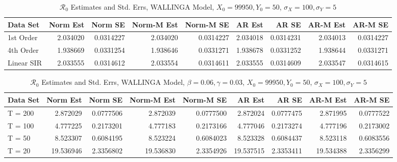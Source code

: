 \message{ !name(draft_v13.tex)}\documentclass[12pt]{article}
\newcommand{\rr}{\ensuremath{\mathcal{R}_0}}
\begin{document}
\begin{table}[H]
	
	\caption{\label{tab:}$\rr$ Estimates and Std. Errs, WALLINGA Model,
		$X_0 = 99950, Y_0 = 50$, $\sigma_X = 100, \sigma_Y = 5$}
	\centering
	\begin{tabular}[t]{l|r|r|r|r|r|r|r|r}
		\hline
		Data Set & Norm Est & Norm SE & Norm-M Est & Norm-M SE & AR Est & AR SE & AR-M Est & AR-M SE\\
		\hline
		1st Order & 2.034020 & 0.0314227 & 2.034020 & 0.0314227 & 2.034018 & 0.0314231 & 2.034013 & 0.0314227\\
		\hline
		4th Order & 1.938669 & 0.0331254 & 1.938646 & 0.0331271 & 1.938678 & 0.0331252 & 1.938644 & 0.0331271\\
		\hline
		Linear SIR & 2.033555 & 0.0314612 & 2.033554 & 0.0314611 & 2.033555 & 0.0314609 & 2.033547 & 0.0314615\\
		\hline
	\end{tabular}
\end{table}

\begin{table}[H]
	
	\caption{\label{tab:}$\rr$ Estimates and Std. Errs, WALLINGA Model,
		$\beta = 0.06, \gamma = 0.03$, $X_0 = 99950, Y_0 = 50$, $\sigma_X = 100, \sigma_Y = 5$}
	\centering
	\begin{tabular}[t]{l|r|r|r|r|r|r|r|r}
		\hline
		Data Set & Norm Est & Norm SE & Norm-M Est & Norm-M SE & AR Est & AR SE & AR-M Est & AR-M SE\\
		\hline
		T = 200 & 2.872029 & 0.0777506 & 2.872039 & 0.0777500 & 2.872024 & 0.0777475 & 2.871995 & 0.0777522\\
		\hline
		T = 100 & 4.777225 & 0.2173201 & 4.777183 & 0.2173166 & 4.777046 & 0.2173274 & 4.777196 & 0.2173002\\
		\hline
		T = 50 & 8.523307 & 0.6084195 & 8.523224 & 0.6084023 & 8.523328 & 0.6084437 & 8.523118 & 0.6083556\\
		\hline
		T = 20 & 19.536946 & 2.3356802 & 19.536830 & 2.3354926 & 19.537515 & 2.3353411 & 19.534388 & 2.3356299\\
		\hline
	\end{tabular}
\end{table}
\end{document}
